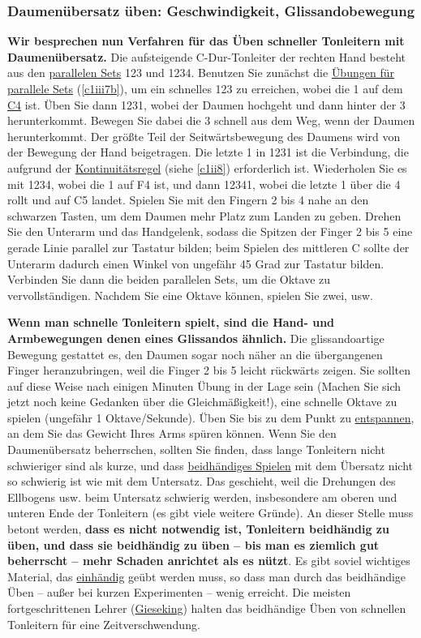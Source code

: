 
\label{c1iii5a2}
\subsubsection{Daumenübersatz üben: Geschwindigkeit, Glissandobewegung}
\label{c1iii5c}

\textbf{Wir besprechen nun Verfahren für das Üben schneller Tonleitern mit Daumenübersatz.}
Die aufsteigende C-Dur-Tonleiter der rechten Hand besteht aus den \hyperref[c1iv2]{parallelen Sets} 123 und 1234.
Benutzen Sie zunächst die \hyperref[c1iii7b]{Übungen für parallele Sets} (\autoref{c1iii7b}), um ein schnelles 123 zu erreichen, wobei die 1 auf dem \hyperref[Noten]{C4} ist.
Üben Sie dann 1231, wobei der Daumen hochgeht und dann hinter der 3 herunterkommt.
Bewegen Sie dabei die 3 schnell aus dem Weg, wenn der Daumen herunterkommt.
Der größte Teil der Seitwärtsbewegung des Daumens wird von der Bewegung der Hand beigetragen.
Die letzte 1 in 1231 ist die Verbindung, die aufgrund der \hyperref[c1ii8]{Kontinuitätsregel} (siehe \autoref{c1ii8}) erforderlich ist.
Wiederholen Sie es mit 1234, wobei die 1 auf F4 ist, und dann 12341, wobei die letzte 1 über die 4 rollt und auf C5 landet.
Spielen Sie mit den Fingern 2 bis 4 nahe an den schwarzen Tasten, um dem Daumen mehr Platz zum Landen zu geben.
Drehen Sie den Unterarm und das Handgelenk, sodass die Spitzen der Finger 2 bis 5 eine gerade Linie parallel zur Tastatur bilden; beim Spielen des mittleren C sollte der Unterarm dadurch einen Winkel von ungefähr 45 Grad zur Tastatur bilden.
Verbinden Sie dann die beiden parallelen Sets, um die Oktave zu vervollständigen.
Nachdem Sie eine Oktave können, spielen Sie zwei, usw.

\textbf{Wenn man schnelle Tonleitern spielt, sind die Hand- und Armbewegungen denen eines Glissandos ähnlich.}
Die glissandoartige Bewegung gestattet es, den Daumen sogar noch näher an die übergangenen Finger heranzubringen, weil die Finger 2 bis 5 leicht rückwärts zeigen.
Sie sollten auf diese Weise nach einigen Minuten Übung in der Lage sein (Machen Sie sich jetzt noch keine Gedanken über die Gleichmäßigkeit!), eine schnelle Oktave zu spielen (ungefähr 1 Oktave/Sekunde).
Üben Sie bis zu dem Punkt zu \hyperref[c1ii14]{entspannen}, an dem Sie das Gewicht Ihres Arms spüren können.
Wenn Sie den Daumenübersatz beherrschen, sollten Sie finden, dass lange Tonleitern nicht schwieriger sind als kurze, und dass \hyperref[c1ii25]{beidhändiges Spielen} mit dem Übersatz nicht so schwierig ist wie mit dem Untersatz.
Das geschieht, weil die Drehungen des Ellbogens usw. beim Untersatz schwierig werden, insbesondere am oberen und unteren Ende der Tonleitern (es gibt viele weitere Gründe).
An dieser Stelle muss betont werden, \textbf{dass es nicht notwendig ist, Tonleitern beidhändig zu üben, und dass sie beidhändig zu üben -- bis man es ziemlich gut beherrscht -- mehr Schaden anrichtet als es nützt}.
Es gibt soviel wichtiges Material, das \hyperref[c1ii7]{einhändig} geübt werden muss, so dass man durch das beidhändige Üben -- außer bei kurzen Experimenten -- wenig erreicht.
Die meisten fortgeschrittenen Lehrer (\hyperref[Gieseking]{Gieseking}) halten das beidhändige Üben von schnellen Tonleitern für eine Zeitverschwendung.


